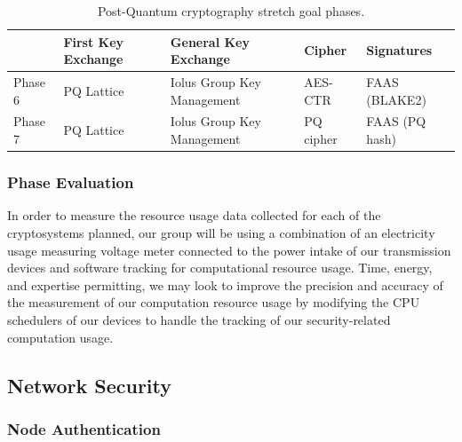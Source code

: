 \documentclass[tikz,a4paper,titlepage]{article}
\begin{document}
\begin{table}[h]
\centering
\begin{tabular}{|l|l|l|l|l|}
\hline
        & First Key Exchange & General Key Exchange & Cipher & Signatures \\ \hline
Phase 6 & PQ Lattice & Iolus Group Key Management & AES-CTR & FAAS (BLAKE2) \\ \hline
Phase 7 & PQ Lattice & Iolus Group Key Management & PQ cipher & FAAS (PQ hash) \\ \hline
\end{tabular}

\caption{Post-Quantum cryptography stretch goal phases.}
\label{PQ-stretchGoals}
\end{table}

\subsubsection{Phase Evaluation}

In order to measure the resource usage data collected for each of the cryptosystems planned, our group will be using a combination of an electricity usage measuring voltage meter connected to the power intake of our transmission devices and software tracking for computational resource usage. Time, energy, and expertise permitting, we may look to improve the precision and accuracy of the measurement of our computation resource usage by modifying the CPU schedulers of our devices to handle the tracking of our security-related computation usage.

\subsection{Network Security}


\subsubsection{Node Authentication}
\label{node_auth}



\end{document}
